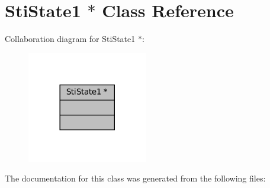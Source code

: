 \hypertarget{classStiState1_01_5}{}\section{Sti\+State1 $\ast$ Class Reference}
\label{classStiState1_01_5}


Collaboration diagram for Sti\+State1 $\ast$\+:
\nopagebreak
\begin{figure}[H]
\begin{center}
\leavevmode
\includegraphics[width=149pt]{classStiState1_01_5__coll__graph}
\end{center}
\end{figure}


The documentation for this class was generated from the following files\+: